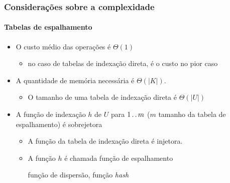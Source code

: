 \documentclass{beamer}
\begin{document}
\begin{frame}

  \frametitle{Considerações sobre a complexidade}
  \framesubtitle{Tabelas de espalhamento}

  \begin{itemize}

    \item O \alert{custo médio} das operações é $\Theta(1)$

      \begin{itemize}

        \item no caso de tabelas de indexação direta, é o custo no \alert{pior caso}

      \end{itemize}
   
    \item A quantidade de memória necessária é $\Theta( | K | )$.

      \begin{itemize}

        \item O tamanho de uma tabela de indexação direta é $\Theta(| U |)$

      \end{itemize}

    \item A função de indexação $h$ de $U$ para $1 \mathinner{\ldotp\ldotp} m$ ($m$ tamanho da tabela
      de espalhamento) é \alert{sobrejetora}

      \begin{itemize}

        \item A função da tabela de indexação direta é injetora.

        \item A função $h$ é chamada \alert{função de espalhamento}

          função de dispersão, função \textit{hash\/}

      \end{itemize}

  \end{itemize}
      
\end{frame}
\end{document}

